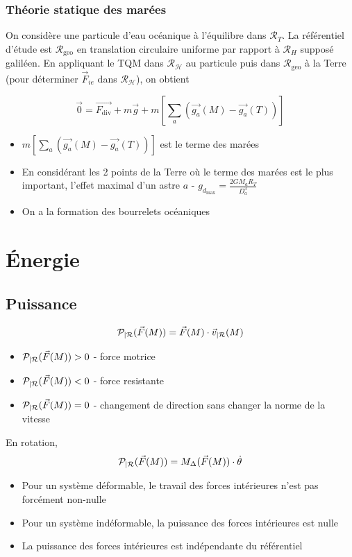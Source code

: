 \documentclass[openany]{book}
\begin{document}
\subsubsection{Théorie statique des marées}
On considère une particule d'eau océanique à l'équilibre dans $\mathcal{R}_T$. La référentiel d'étude est $\mathcal{R}_{\text{geo}}$ en translation circulaire uniforme par rapport à $\mathcal{R}_H$ supposé galiléen. En appliquant le TQM dans $\mathcal{R_H}$ au particule puis dans $\mathcal{R}_{\text{geo}}$ à la Terre (pour déterminer $\vec{F}_{ie}$ dans $\mathcal{R_H}$), on obtient

\[ \vec{0} = \vec{F_{\text{div}}} + m\vec{g} + m \left [ \sum_{a} (\vec{g_a}(M) - \vec{g_a}(T))  \right ] \]

\begin{itemize}
    \item $m \left [ \sum_{a} (\vec{g_a}(M) - \vec{g_a}(T))  \right ]$ est le terme des marées
    \item En considérant les 2 points de la Terre où le terme des marées est le plus important, l'effet maximal d'un astre $a$ - $g_{d_\text{max}} = \frac{2GM_a R_T}{D_a^3}$
    \item On a la formation des bourrelets océaniques
\end{itemize}

\section{Énergie}
\subsection{Puissance}
\[ \mathcal{P}_{|\mathcal{R}}(\vec{F}(M)) =  \vec{F}(M) \cdot \vec{v}_{|\mathcal{R}}(M) \]
\begin{itemize}
    \item $ \mathcal{P}_{|\mathcal{R}}(\vec{F}(M)) > 0 $ - force motrice
    \item $ \mathcal{P}_{|\mathcal{R}}(\vec{F}(M)) < 0 $ - force resistante 
    \item $ \mathcal{P}_{|\mathcal{R}}(\vec{F}(M)) = 0 $ - changement de direction sans changer la norme de la vitesse
\end{itemize}

\noindent En rotation,
\[ \mathcal{P}_{|\mathcal{R}}(\vec{F}(M)) = M_{\Delta}(\vec{F}(M)) \cdot \dot{\theta} \]

\begin{itemize}
    \item Pour un système déformable, le travail des forces intérieures n'est pas forcément non-nulle
    \item Pour un système indéformable, la puissance des forces intérieures est nulle
    \item La puissance des forces intérieures est indépendante du référentiel
\end{itemize}
\end{document}
